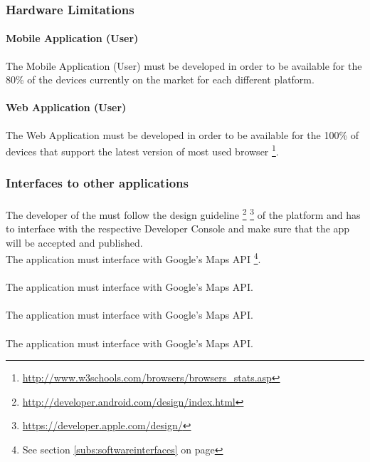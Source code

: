 \subsubsection{Hardware Limitations} 
\label{ssub:hardware_limitations}
\paragraph{Mobile Application (User)} 
The Mobile Application (User) must be developed in order to be available for the 80\% of the devices currently on the market for each different platform.
\paragraph{Web Application (User)}
The Web Application must be developed in order to be available for the 100\% of devices that support the latest version of most used browser \footnote {\url{http://www.w3schools.com/browsers/browsers_stats.asp}}.


\subsubsection{Interfaces to other applications} 
\label{ssub:interfaces_to_other_applications}
\paragraph{} 
The developer of the \textbf{} must follow the design guideline \footnote{\url{http://developer.android.com/design/index.html}} \footnote{\url{https://developer.apple.com/design/}} of the platform and has to interface with the respective Developer Console and make sure that the app will be accepted and published. \\
The application must interface with Google's Maps API \footnote{See section \ref{subs:softwareinterfaces} on page \pageref{subs:softwareinterfaces}}.
\paragraph{} 
The application must interface with Google's Maps API.
\paragraph{} 
The application must interface with Google's Maps API.
\paragraph{} 
The application must interface with Google's Maps API.

